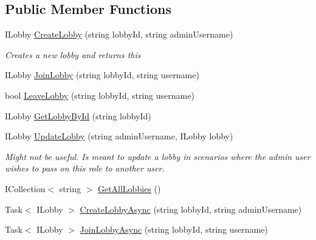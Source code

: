 \subsection*{Public Member Functions}
\begin{DoxyCompactItemize}
\item 
I\+Lobby \mbox{\hyperlink{interface_application_1_1_interfaces_1_1_i_lobby_controller_abefe3510b20e3db41c4d8062f8cdc2bc}{Create\+Lobby}} (string lobby\+Id, string admin\+Username)
\begin{DoxyCompactList}\small\item\em Creates a new lobby and returns this \end{DoxyCompactList}\item 
I\+Lobby \mbox{\hyperlink{interface_application_1_1_interfaces_1_1_i_lobby_controller_a17c37ec6dbb98ab07deb4e4f9800a68e}{Join\+Lobby}} (string lobby\+Id, string username)
\item 
bool \mbox{\hyperlink{interface_application_1_1_interfaces_1_1_i_lobby_controller_ad95e5c656813094f7abec7b81ea568e1}{Leave\+Lobby}} (string lobby\+Id, string username)
\item 
I\+Lobby \mbox{\hyperlink{interface_application_1_1_interfaces_1_1_i_lobby_controller_aaa584fec6fc0e1e0690aa81e7fde3af2}{Get\+Lobby\+By\+Id}} (string lobby\+Id)
\item 
I\+Lobby \mbox{\hyperlink{interface_application_1_1_interfaces_1_1_i_lobby_controller_a4d0618e880423f15785360453bf90f90}{Update\+Lobby}} (string admin\+Username, I\+Lobby lobby)
\begin{DoxyCompactList}\small\item\em Might not be useful. Is meant to update a lobby in scenarios where the admin user wishes to pass on this role to another user. \end{DoxyCompactList}\item 
I\+Collection$<$ string $>$ \mbox{\hyperlink{interface_application_1_1_interfaces_1_1_i_lobby_controller_a2e1d8f72361ee48e956fb473ceabadf4}{Get\+All\+Lobbies}} ()
\item 
Task$<$ I\+Lobby $>$ \mbox{\hyperlink{interface_application_1_1_interfaces_1_1_i_lobby_controller_ae507a1d23088662b8c37692bbb93040e}{Create\+Lobby\+Async}} (string lobby\+Id, string admin\+Username)
\item 
Task$<$ I\+Lobby $>$ \mbox{\hyperlink{interface_application_1_1_interfaces_1_1_i_lobby_controller_aba87a2245b2c274cf977aeaf193eef73}{Join\+Lobby\+Async}} (string lobby\+Id, string username)
\item 

\end{DoxyCompactItemize}
